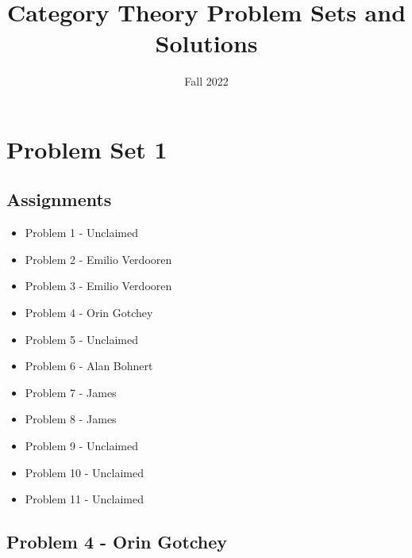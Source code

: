 \documentclass{article}
\title{Category Theory Problem Sets and Solutions}
\author{Fall 2022}
\begin{document}
	
	\maketitle
	\tableofcontents
	\newpage
	\section{Problem Set 1}
	\subsection*{Assignments}
	\begin{itemize}
		\item Problem 1 - Unclaimed
		\item Problem 2 - Emilio Verdooren
		\item Problem 3 - Emilio Verdooren
		\item Problem 4 - Orin Gotchey
		\item Problem 5 - Unclaimed
		\item Problem 6 - Alan Bohnert
		\item Problem 7 - James
		\item Problem 8 - James
		\item Problem 9 - Unclaimed
		\item Problem 10 - Unclaimed
		\item Problem 11 - Unclaimed
	\end{itemize}
	
	\subsection{Problem 4 - Orin Gotchey}
\end{document}
